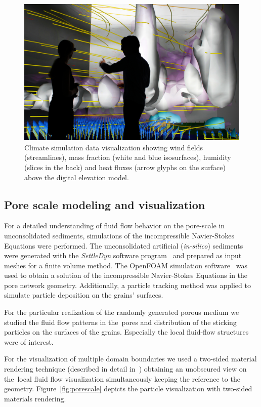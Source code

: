 \documentclass[twocolumn]{svjour3}          %
\begin{document}
\begin{figure}[htb]
  \includegraphics[width=\linewidth]{images/wind.jpg}
  \caption{Climate simulation data visualization showing wind fields (streamlines), mass fraction (white and blue isosurfaces), humidity (slices in the back) and heat fluxes (arrow glyphs on the surface) above the digital elevation model.}
\label{fig:wind}
\end{figure}


\subsection{Pore scale modeling and visualization}
\label{pore-scale}

For a detailed understanding of fluid flow behavior on the pore-scale in unconsolidated sediments, simulations of the incompressible Navier-Stokes Equations were performed. The unconsolidated artificial (\emph{in-silico}) sediments were generated with the \emph{SettleDyn} software program~\cite{web:SettleDyn} and prepared as input meshes for a finite volume method. The OpenFOAM simulation software~\cite{web:OpenFOAM} was used to obtain a solution of the incompressible Navier-Stokes Equations in the pore network geometry. Additionally, a particle tracking method was applied to simulate particle deposition on the grains' surfaces.

For the particular realization of the randomly generated porous medium we studied the fluid flow patterns in the~pores and distribution of the sticking particles on the surfaces of the grains. Especially the local fluid-flow structures were of interest.

For the visualization of multiple domain boundaries we used a two-sided material rendering technique (described in detail in~\cite{naumov:ees}) obtaining an unobscured view on the~local fluid flow visualization simultaneously keeping the reference to the geometry. Figure~\ref{fig:porescale} depicts the particle visualization with
two-sided materials rendering.
\end{document}
